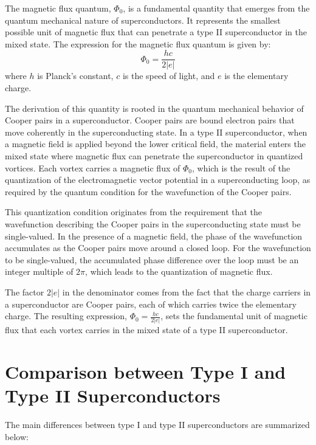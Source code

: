 \documentclass{article}
\begin{document}
\begin{theorem}
    The magnetic flux quantum, \(\Phi_0\), is a fundamental quantity that emerges from the quantum mechanical nature of superconductors. It represents the smallest possible unit of magnetic flux that can penetrate a type II superconductor in the mixed state. The expression for the magnetic flux quantum is given by:
\[
\Phi_0 = \frac{hc}{2|e|}
\]
where \(h\) is Planck's constant, \(c\) is the speed of light, and \(e\) is the elementary charge.

The derivation of this quantity is rooted in the quantum mechanical behavior of Cooper pairs in a superconductor. Cooper pairs are bound electron pairs that move coherently in the superconducting state. In a type II superconductor, when a magnetic field is applied beyond the lower critical field, the material enters the mixed state where magnetic flux can penetrate the superconductor in quantized vortices. Each vortex carries a magnetic flux of \(\Phi_0\), which is the result of the quantization of the electromagnetic vector potential in a superconducting loop, as required by the quantum condition for the wavefunction of the Cooper pairs.

This quantization condition originates from the requirement that the wavefunction describing the Cooper pairs in the superconducting state must be single-valued. In the presence of a magnetic field, the phase of the wavefunction accumulates as the Cooper pairs move around a closed loop. For the wavefunction to be single-valued, the accumulated phase difference over the loop must be an integer multiple of \(2\pi\), which leads to the quantization of magnetic flux.

The factor \(2|e|\) in the denominator comes from the fact that the charge carriers in a superconductor are Cooper pairs, each of which carries twice the elementary charge. The resulting expression, \(\Phi_0 = \frac{hc}{2|e|}\), sets the fundamental unit of magnetic flux that each vortex carries in the mixed state of a type II superconductor. \end{theorem}

\section{Comparison between Type I and Type II Superconductors}

The main differences between type I and type II superconductors are summarized below:
\end{document}
